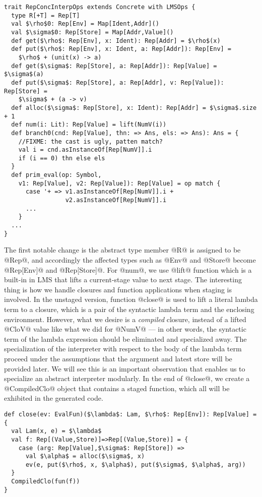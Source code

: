 \begin{lstlisting}
trait RepConcInterpOps extends Concrete with LMSOps {
  type R[+T] = Rep[T]
  val $\rho$0: Rep[Env] = Map[Ident,Addr]()
  val $\sigma$0: Rep[Store] = Map[Addr,Value]()
  def get($\rho$: Rep[Env], x: Ident): Rep[Addr] = $\rho$(x)
  def put($\rho$: Rep[Env], x: Ident, a: Rep[Addr]): Rep[Env] = 
    $\rho$ + (unit(x) -> a)
  def get($\sigma$: Rep[Store], a: Rep[Addr]): Rep[Value] = $\sigma$(a)
  def put($\sigma$: Rep[Store], a: Rep[Addr], v: Rep[Value]): Rep[Store] = 
    $\sigma$ + (a -> v)
  def alloc($\sigma$: Rep[Store], x: Ident): Rep[Addr] = $\sigma$.size + 1
  def num(i: Lit): Rep[Value] = lift(NumV(i))
  def branch0(cnd: Rep[Value], thn: => Ans, els: => Ans): Ans = {
    //FIXME: the cast is ugly, patten match?
    val i = cnd.asInstanceOf[Rep[NumV]].i
    if (i == 0) thn else els
  }
  def prim_eval(op: Symbol, 
    v1: Rep[Value], v2: Rep[Value]): Rep[Value] = op match {
      case '+ => v1.asInstanceOf[Rep[NumV]].i + 
                 v2.asInstanceOf[Rep[NumV]].i
      ...
    }
  ...
}
\end{lstlisting}

The first notable change is the abstract type member @R@ is assigned to be @Rep@, and accordingly the affected 
types such as @Env@ and @Store@ become @Rep[Env]@ and @Rep[Store]@. For @num@, we use @lift@ function which is a
built-in in LMS that lifts a current-stage value to next stage.
The interesting thing is how we handle closures and function applications when staging is involved.
In the unstaged version, function @close@ is used to lift a literal lambda term to a closure, which
is a pair of the syntactic lambda term and the enclosing environment.
However, what we desire is a \textit{compiled} closure, instead of a lifted @CloV@ value like 
what we did for @NumV@ --- in other words, the syntactic term of the lambda expression should be 
eliminated and specialized away.
The specialization of the interpreter with respect to the body of the lambda term proceed under the
assumptions that the argument and latest store will be provided later. 
We will see this is an important observation that enables us to specialize an abstract interpreter modularly.
In the end of @close@, we create a @CompiledClo@ object that contains a staged function, which all will be
exhibited in the generated code.

\begin{lstlisting}
def close(ev: EvalFun)($\lambda$: Lam, $\rho$: Rep[Env]): Rep[Value] = {
  val Lam(x, e) = $\lambda$
  val f: Rep[(Value,Store)]=>Rep[(Value,Store)] = { 
    case (arg: Rep[Value],$\sigma$: Rep[Store]) =>
      val $\alpha$ = alloc($\sigma$, x)
      ev(e, put($\rho$, x, $\alpha$), put($\sigma$, $\alpha$, arg)) 
  }
  CompiledClo(fun(f))
}
\end{lstlisting}

